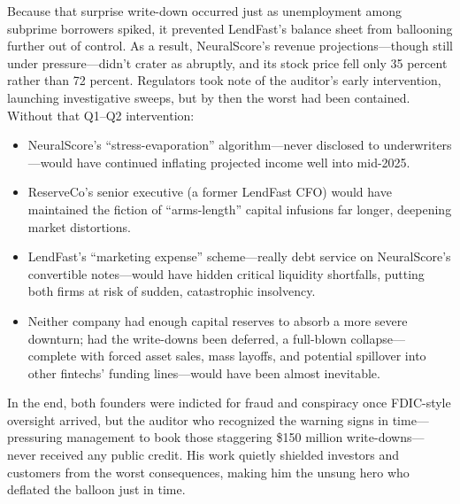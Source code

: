 Because that surprise write-down occurred just as unemployment among subprime borrowers spiked, it prevented LendFast’s balance sheet from ballooning further out of control. As a result, NeuralScore’s revenue projections—though still under pressure—didn’t crater as abruptly, and its stock price fell only 35 percent rather than 72 percent. Regulators took note of the auditor’s early intervention, launching investigative sweeps, but by then the worst had been contained. Without that Q1–Q2 intervention:

\begin{itemize}
    \item  NeuralScore’s “stress-evaporation” algorithm—never disclosed to underwriters—would have continued inflating projected income well into mid-2025.
    \item  ReserveCo’s senior executive (a former LendFast CFO) would have maintained the fiction of “arms-length” capital infusions far longer, deepening market distortions.
    \item  LendFast’s “marketing expense” scheme—really debt service on NeuralScore’s convertible notes—would have hidden critical liquidity shortfalls, putting both firms at risk of sudden, catastrophic insolvency.
    \item  Neither company had enough capital reserves to absorb a more severe downturn; had the write-downs been deferred, a full-blown collapse—complete with forced asset sales, mass layoffs, and potential spillover into other fintechs’ funding lines—would have been almost inevitable.
\end{itemize}

In the end, both founders were indicted for fraud and conspiracy once FDIC-style oversight arrived, but the auditor who recognized the warning signs in time—pressuring management to book those staggering \$150 million write-downs—never received any public credit. His work quietly shielded investors and customers from the worst consequences, making him the unsung hero who deflated the balloon just in time.


